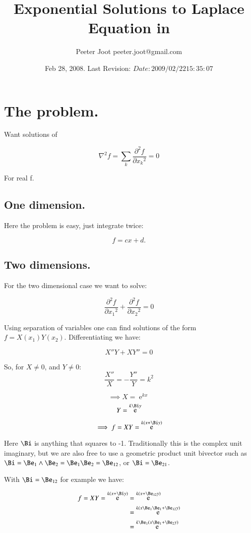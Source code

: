 \documentclass{article}      %
\title{Exponential Solutions to Laplace Equation in \R{N}}
\author{Peeter Joot \quad peeter.joot@gmail.com}         %
\date{ Feb 28, 2008.  Last Revision: $Date: 2009/02/22 15:35:07 $ }
\newcommand{\laplacian}[0]{\nabla^2}
\newcommand{\dsqxj}[2] {\frac {\partial^2 {#1}} {\partial {x_{#2}}^2}}
\DeclareMathOperator{\Exp}{e}
\begin{document}

\maketitle{}

\section{ The problem. }

Want solutions of

\begin{equation}\label{eqn:laplacian}
\laplacian f = \sum_k \dsqxj{f}{k} = 0
\end{equation}

For real f.

\subsection{ One dimension. }

Here the problem is easy, just integrate twice:

\[
f = cx + d.
\]

\subsection{ Two dimensions. }

For the two dimensional case we want to solve:

\[
\dsqxj{f}{1} + \dsqxj{f}{2} = 0
\]

Using separation of variables one can find solutions of the form $f = X(x_1)Y(x_2)$.  Differentiating we have:

\[
X''Y + XY'' = 0
\]

So, for $X \ne 0$, and $Y \ne 0$:
\[
\frac{X''}{X} = -\frac{Y''}{Y} = k^2
\]

\[
\implies
X = \Exp^{kx}
\]
\[
Y = \Exp^{k\Bi y}
\]

\[
\implies
f = XY = \Exp^{k(x + \Bi y)}
\]

Here $\Bi$ is anything that squares to -1.  Traditionally this is the
complex unit imaginary, but we are also free to use a geometric product unit bivector such as $\Bi = \Be_1 \wedge \Be_2 = \Be_1\Be_2 = \Be_{12}$, or $\Bi = \Be_{21}$.

With $\Bi = \Be_{12}$ for example we have:

\begin{align*}
f = XY = \Exp^{k(x + \Bi y)}
&= \Exp^{k(x + \Be_{12} y)} \\
&= \Exp^{k(x\Be_{1}\Be_1 + \Be_{12} y)} \\
&= \Exp^{k\Be_1(x\Be_1 + \Be_2 y)} \\
\end{align*}
\end{document}
